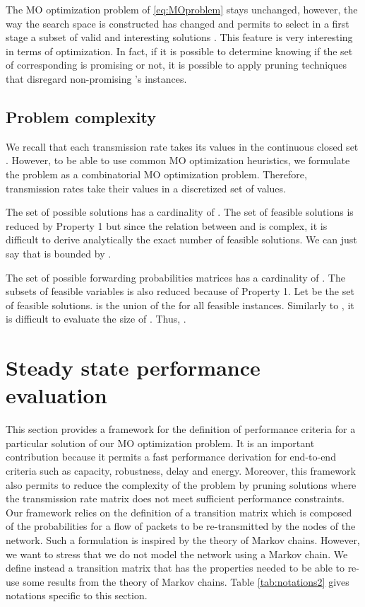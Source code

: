 \documentclass[a4paper]{article}
\begin{document}
The MO optimization problem of \eqref{eq:MOproblem} stays unchanged, however, the way the search space is constructed has changed and permits to select in a first stage a subset of valid and interesting solutions . 
This feature is very interesting in terms of optimization. In fact, if it is possible to determine knowing  if the set of corresponding  is promising or not, it is possible to apply pruning techniques that disregard non-promising 's instances. 

\subsection{Problem complexity}
We recall that each transmission rate  takes its values in the continuous closed set . However, to be able to use common MO optimization heuristics, we formulate the problem as a combinatorial MO optimization problem. Therefore,  transmission rates take their values in a discretized set  of  values.

The set  of possible  solutions has a cardinality of . The set of feasible solutions is reduced by Property 1 but since the relation between  and  is complex, it is difficult to derive analytically the exact number of feasible solutions. We can just say that  is bounded by .

The set  of possible forwarding probabilities matrices has a cardinality of . The subsets  of feasible  variables is also reduced because of Property 1. Let  be the set of feasible  solutions. 
 is the union of the  for all feasible  instances. 
Similarly to , it is difficult to evaluate the size of . Thus, .




\section{Steady state performance evaluation}\label{sec:steadystate}

This section provides a framework for the definition of performance criteria for a particular solution  of our MO optimization problem. 
It is an important contribution because it permits a fast performance derivation for end-to-end criteria such as capacity, robustness, delay and energy. Moreover, this framework also permits to reduce the complexity of the problem by pruning solutions where the transmission rate matrix  does not meet sufficient performance constraints. 
Our framework relies on the definition of a transition matrix which is composed of the probabilities for a flow of packets to be re-transmitted by the nodes of the network. Such a formulation is inspired by the theory of Markov chains. However, we want to stress that we do not model the network using a Markov chain. We define instead a transition matrix that has the properties needed to be able to re-use some results from the theory of Markov chains.
Table \ref{tab:notations2} gives notations specific to this section. 
\end{document}
